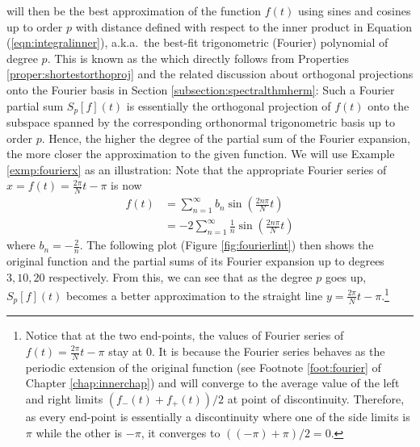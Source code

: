 will then be the best approximation of the function $f(t)$ using sines and cosines up to order $p$ with distance defined with respect to the inner product in Equation (\ref{eqn:integralinner}), a.k.a.\ the best-fit trigonometric (Fourier) polynomial of degree $p$. This is known as the  which directly follows from Properties \ref{proper:shortestorthoproj} and the related discussion about orthogonal projections onto the Fourier basis in Section \ref{subsection:spectralthmherm}: Such a Fourier partial sum $S_p[f](t)$ is essentially the orthogonal projection of $f(t)$ onto the subspace spanned by the corresponding orthonormal trigonometric basis up to order $p$. Hence, the higher the degree of the partial sum of the Fourier expansion, the more closer the approximation to the given function. We will use Example \ref{exmp:fourierx} as an illustration: Note that the appropriate Fourier series of $x = f(t) = \frac{2\pi}{N}t - \pi$ is now
\begin{align*}
f(t) &= \sum_{n=1}^{\infty} b_n \sin(\frac{2n\pi}{N}t) \\
&= -2 \sum_{n=1}^{\infty} \frac{1}{n} \sin(\frac{2n\pi}{N}t)
\end{align*}
where $b_n = -\frac{2}{n}$. The following plot (Figure \ref{fig:fourierlint}) then shows the original function and the partial sums of its Fourier expansion up to degrees $3,10,20$ respectively. From this, we can see that as the degree $p$ goes up, $S_p[f](t)$ becomes a better approximation to the straight line $y = \frac{2\pi}{N}t - \pi$.\footnote{Notice that at the two end-points, the values of Fourier series of $f(t) = \frac{2\pi}{N}t - \pi$ stay at $0$. It is because the Fourier series behaves as the periodic extension of the original function (see Footnote \ref{foot:fourier} of Chapter \ref{chap:innerchap}) and will converge to the average value of the left and right limits $(f_-(t) + f_+(t))/2$ at point of discontinuity. Therefore, as every end-point is essentially a discontinuity where one of the side limits is $\pi$ while the other is $-\pi$, it converges to $((-\pi) + \pi)/2 = 0$.}
